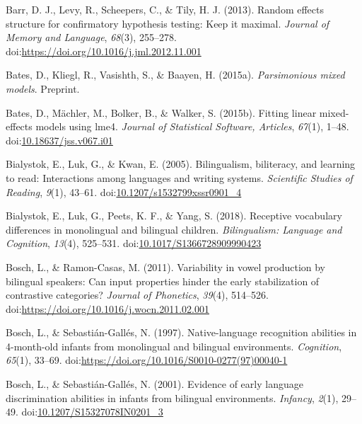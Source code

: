 \documentclass[,man,floatsintext]{apa6}
\begin{document}
\leavevmode\hypertarget{ref-barr_2013}{}%
Barr, D. J., Levy, R., Scheepers, C., \& Tily, H. J. (2013). Random effects structure for confirmatory hypothesis testing: Keep it maximal. \emph{Journal of Memory and Language}, \emph{68}(3), 255--278. doi:\href{https://doi.org/https://doi.org/10.1016/j.jml.2012.11.001}{https://doi.org/10.1016/j.jml.2012.11.001}

\leavevmode\hypertarget{ref-bates_2015a}{}%
Bates, D., Kliegl, R., Vasishth, S., \& Baayen, H. (2015a). \emph{Parsimonious mixed models}. Preprint.

\leavevmode\hypertarget{ref-bates_2015b}{}%
Bates, D., Mächler, M., Bolker, B., \& Walker, S. (2015b). Fitting linear mixed-effects models using lme4. \emph{Journal of Statistical Software, Articles}, \emph{67}(1), 1--48. doi:\href{https://doi.org/10.18637/jss.v067.i01}{10.18637/jss.v067.i01}

\leavevmode\hypertarget{ref-bialystok_2005}{}%
Bialystok, E., Luk, G., \& Kwan, E. (2005). Bilingualism, biliteracy, and learning to read: Interactions among languages and writing systems. \emph{Scientific Studies of Reading}, \emph{9}(1), 43--61. doi:\href{https://doi.org/10.1207/s1532799xssr0901_4}{10.1207/s1532799xssr0901\_4}

\leavevmode\hypertarget{ref-bialystok_2018}{}%
Bialystok, E., Luk, G., Peets, K. F., \& Yang, S. (2018). Receptive vocabulary differences in monolingual and bilingual children. \emph{Bilingualism: Language and Cognition}, \emph{13}(4), 525--531. doi:\href{https://doi.org/10.1017/S1366728909990423}{10.1017/S1366728909990423}

\leavevmode\hypertarget{ref-bosch_2011}{}%
Bosch, L., \& Ramon-Casas, M. (2011). Variability in vowel production by bilingual speakers: Can input properties hinder the early stabilization of contrastive categories? \emph{Journal of Phonetics}, \emph{39}(4), 514--526. doi:\href{https://doi.org/https://doi.org/10.1016/j.wocn.2011.02.001}{https://doi.org/10.1016/j.wocn.2011.02.001}

\leavevmode\hypertarget{ref-bosch_1997}{}%
Bosch, L., \& Sebastián-Gallés, N. (1997). Native-language recognition abilities in 4-month-old infants from monolingual and bilingual environments. \emph{Cognition}, \emph{65}(1), 33--69. doi:\href{https://doi.org/https://doi.org/10.1016/S0010-0277(97)00040-1}{https://doi.org/10.1016/S0010-0277(97)00040-1}

\leavevmode\hypertarget{ref-bosch_2001}{}%
Bosch, L., \& Sebastián-Gallés, N. (2001). Evidence of early language discrimination abilities in infants from bilingual environments. \emph{Infancy}, \emph{2}(1), 29--49. doi:\href{https://doi.org/10.1207/S15327078IN0201_3}{10.1207/S15327078IN0201\_3}
\end{document}

